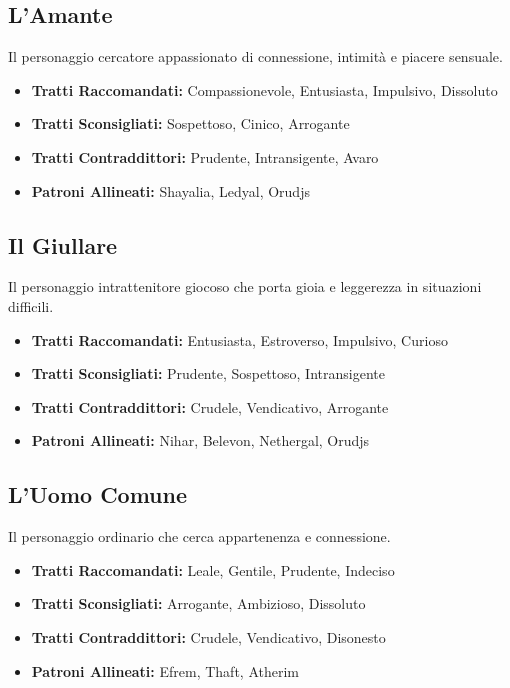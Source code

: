 \begin{multicols}{2}
\subsection*{L'Amante}
Il personaggio cercatore appassionato di connessione, intimità e piacere sensuale.

\noindent\begin{itemize}[leftmargin=*] \setlength{\itemsep}{0pt}
\item \textbf{Tratti Raccomandati:} Compassionevole, Entusiasta, Impulsivo, Dissoluto
\item \textbf{Tratti Sconsigliati:} Sospettoso, Cinico, Arrogante
\item \textbf{Tratti Contraddittori:} Prudente, Intransigente, Avaro
\item \textbf{Patroni Allineati:} Shayalia, Ledyal, Orudjs
\end{itemize}

\subsection*{Il Giullare}
Il personaggio intrattenitore giocoso che porta gioia e leggerezza in situazioni difficili.

\noindent\begin{itemize}[leftmargin=*] \setlength{\itemsep}{0pt}
\item \textbf{Tratti Raccomandati:} Entusiasta, Estroverso, Impulsivo, Curioso
\item \textbf{Tratti Sconsigliati:} Prudente, Sospettoso, Intransigente
\item \textbf{Tratti Contraddittori:} Crudele, Vendicativo, Arrogante
\item \textbf{Patroni Allineati:} Nihar, Belevon, Nethergal, Orudjs
\end{itemize}

\subsection*{L'Uomo Comune}
Il personaggio ordinario che cerca appartenenza e connessione.

\noindent\begin{itemize}[leftmargin=*] \setlength{\itemsep}{0pt}
\item \textbf{Tratti Raccomandati:} Leale, Gentile, Prudente, Indeciso
\item \textbf{Tratti Sconsigliati:} Arrogante, Ambizioso, Dissoluto
\item \textbf{Tratti Contraddittori:} Crudele, Vendicativo, Disonesto
\item \textbf{Patroni Allineati:} Efrem, Thaft, Atherim
\end{itemize}


\end{multicols}
